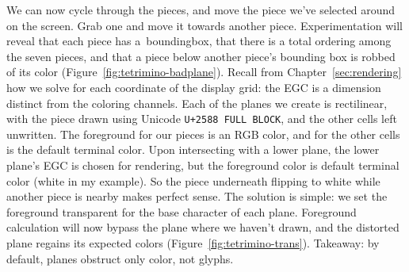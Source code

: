 We can now cycle through the pieces, and move the piece we've selected around
on the screen. Grab one and move it towards another piece. Experimentation will
reveal that each piece has a~\gls{boundingbox}, that there is a total ordering
among the seven pieces, and that a piece below another piece's bounding box is
robbed of its color (Figure~\ref{fig:tetrimino-badplane}). Recall from
Chapter~\ref{sec:rendering} how we solve for each coordinate of the display
grid: the EGC is a dimension distinct from the coloring channels. Each of the
planes we create is rectilinear, with the piece drawn using Unicode
\texttt{U+2588 FULL BLOCK}, and the other cells left unwritten. The foreground
for our pieces is an RGB color, and for the other cells is the default terminal
color. Upon intersecting with a lower plane, the lower plane's EGC is chosen for
rendering, but the foreground color is default terminal color (white in my
example). So the piece underneath flipping to white while another piece is
nearby makes perfect sense. The solution is simple: we set the foreground
transparent for the base character of each plane. Foreground calculation will
now bypass the plane where we haven't drawn, and the distorted plane regains
its expected colors (Figure~\ref{fig:tetrimino-trans}). Takeaway: by default, planes
obstruct only color, not glyphs.

